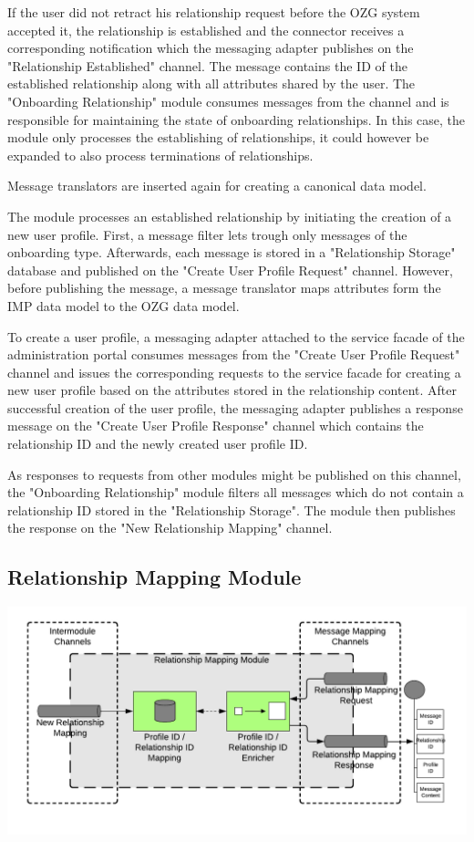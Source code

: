 If the user did not retract his relationship request before the OZG system accepted it, the relationship is established and the connector receives a corresponding notification which the messaging adapter publishes on the "Relationship Established" channel. The message contains the ID of the established relationship along with all attributes shared by the user. The "Onboarding Relationship" module consumes messages from the channel and is responsible for maintaining the state of onboarding relationships. In this case, the module only processes the establishing of relationships, it could however be expanded to also process terminations of relationships.

Message translators are inserted again for creating a canonical data model.

The module processes an established relationship by initiating the creation of a new user profile. First, a message filter lets trough only messages of the onboarding type. Afterwards, each message is stored in a "Relationship Storage" database and published on the "Create User Profile Request" channel. However, before publishing the message, a message translator maps attributes form the IMP data model to the OZG data model.

To create a user profile, a messaging adapter attached to the service facade of the administration portal consumes messages from the "Create User Profile Request" channel and issues the corresponding requests to the service facade for creating a new user profile based on the attributes stored in the relationship content. After successful creation of the user profile, the messaging adapter publishes a response message on the "Create User Profile Response" channel which contains the relationship ID and the newly created user profile ID.

As responses to requests from other modules might be published on this channel, the "Onboarding Relationship" module filters all messages which do not contain a relationship ID stored in the "Relationship Storage". The module then publishes the response on the "New Relationship Mapping" channel.

\subsection{Relationship Mapping Module}

\begin{center}
    \includegraphics[scale=0.6]{Diagrams/Integration Architecture 1/Technological Integration/9. Relationship Mapping.pdf}
\end{center}

